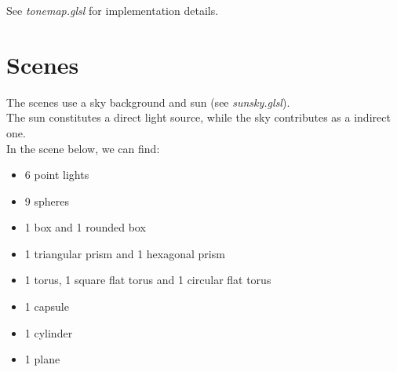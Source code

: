 \documentclass[a4paper,10pt]{article}
\begin{document}
\noindent
See \textit{tonemap.glsl} for implementation details.

\section{Scenes}

The scenes use a sky background and sun (see \textit{sunsky.glsl}). \\
The sun constitutes a direct light source, while the sky contributes as a indirect one. \\

\noindent
In the scene below, we can find:
\begin{itemize}
	\item 6 point lights
	\item 9 spheres
	\item 1 box and 1 rounded box
	\item 1 triangular prism and 1 hexagonal prism
	\item 1 torus, 1 square flat torus and 1 circular flat torus
	\item 1 capsule
	\item 1 cylinder
	\item 1 plane
\end{itemize}
\end{document}
